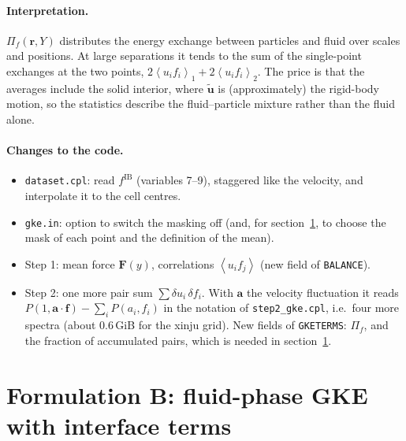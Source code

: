 \documentclass[11pt,a4paper]{article}
\newcommand{\avg}[1]{\left\langle #1 \right\rangle}
\newcommand{\du}{\delta u}
\newcommand{\vect}[1]{\boldsymbol{#1}}
\begin{document}
\paragraph{Interpretation.} $\Pi_f(\vect r,Y)$ distributes the energy
exchange between particles and fluid over scales and positions. At large
separations it tends to the sum of the single-point exchanges at the two
points, $2\avg{u_if_i}_1+2\avg{u_if_i}_2$. The price is that the averages
include the solid interior, where $\tilde{\vect u}$ is (approximately) the
rigid-body motion, so the statistics describe the fluid--particle mixture
rather than the fluid alone.

\paragraph{Changes to the code.}
\begin{itemize}[itemsep=1pt]
\item \texttt{dataset.cpl}: read $f^\mathrm{IB}$ (variables 7--9), staggered
  like the velocity, and interpolate it to the cell centres.
\item \texttt{gke.in}: option to switch the masking off (and, for
  section~\ref{sec:fluid}, to choose the mask of each point and the
  definition of the mean).
\item Step 1: mean force $\vect F(y)$, correlations $\avg{u_if_j}$ (new field
  of \texttt{BALANCE}).
\item Step 2: one more pair sum $\sum\du_i\,\delta f_i$. With $\vect a$ the
  velocity fluctuation it reads $P(1,\vect a\cdot\vect f)-\sum_iP(a_i,f_i)$
  in the notation of \texttt{step2\_gke.cpl}, i.e.\ four more spectra (about
  $0.6$\,GiB for the xinju grid). New fields of \texttt{GKETERMS}: $\Pi_f$,
  and the fraction of accumulated pairs, which is needed in
  section~\ref{sec:fluid}.
\end{itemize}

\section{Formulation B: fluid-phase GKE with interface terms}
\label{sec:fluid}
\end{document}
